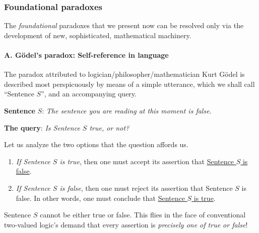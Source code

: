 

\subsubsection{Foundational paradoxes}
\label{sec:paradoxes}

The {\em foundational} paradoxes that we present now can be resolved only via the development of new, sophisticated, mathematical machinery.

\paragraph{A.  G\"{o}del's paradox: Self-reference in language}

 

The paradox attributed to logician/philosopher/mathematician Kurt G\"{o}del is described most perspicuously by means of a simple utterance, which we shall call ``Sentence $S$'', and an accompanying query.

\medskip

\noindent
{\bf Sentence} $S$:  {\em The sentence you are reading at this moment is false.}

\smallskip

\noindent
{\bf The query}: {\it Is Sentence $S$ true, or not?}

\bigskip

\noindent
Let us analyze the two options that the question affords us.
\begin{enumerate}
\item
{\em If Sentence $S$ is true}, then one must accept its assertion that \underline{Sentence $S$ is false}.

\medskip\item
{\em If Sentence $S$ is false}, then one must reject its assertion that Sentence $S$ is false.  In other words, one must conclude that \underline{Sentence $S$ is true}.
\end{enumerate}

\medskip

\noindent
Sentence $S$ cannot be either true or false.  This flies in the face of conventional two-valued logic's demand that every assertion is {\em precisely one of {\em true} or {\em false}}!

